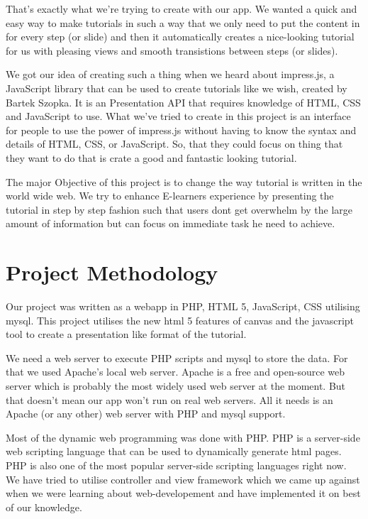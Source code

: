 \documentclass[12pt,a4paper]{article}
\begin{document}
That's exactly what we're trying to create with our app. We wanted a quick and easy way to make tutorials in such a way that we only need to put the content in for every step (or slide) and then it automatically creates a nice-looking tutorial for us with pleasing views and smooth transistions between steps (or slides).

We got our idea of creating such a thing when we heard about impress.js, a JavaScript library that can be used to create tutorials like we wish, created by Bartek Szopka. It is an Presentation API that requires knowledge of HTML, CSS and JavaScript to use. What we've tried to create in this project is an interface for people to use the power of impress.js without having to know the syntax and details of HTML, CSS, or JavaScript. So, that they could focus on thing that they want to do that is crate a good and fantastic looking tutorial.

The major Objective of this project is to change the way tutorial is written in the world wide web. We try to enhance E-learners experience by presenting the tutorial in step by step fashion such that users dont get overwhelm by the large amount of information but can focus on immediate task he need to achieve. 

\section{Project Methodology}

Our project was written as a webapp in PHP, HTML 5, JavaScript, CSS utilising mysql. This project utilises the new html 5 features of canvas and the javascript tool to create a presentation like format of the tutorial.

We need a web server to execute PHP scripts and mysql to store the data. For that we used Apache's local web server. Apache is a free and open-source web server which is probably the most widely used web server at the moment. But that doesn't mean our app won't run on real web servers. All it needs is an Apache (or any other) web server with PHP and mysql support.

Most of the dynamic web programming was done with PHP. PHP is a server-side web scripting language that can be used to dynamically generate html pages. PHP is also one of the most popular server-side scripting languages right now. We have tried to utilise controller and view framework which we came up against when we were learning about web-developement and have implemented it on best of our knowledge.
\end{document}

